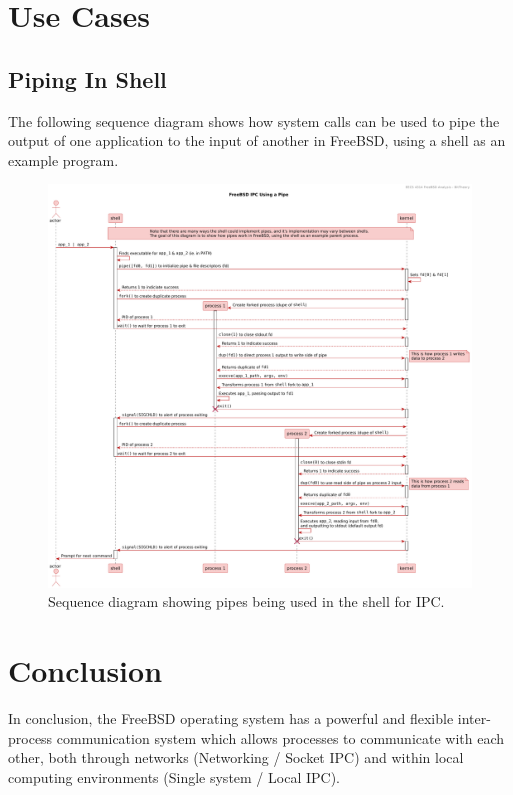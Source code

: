 \documentclass[12pt, dvipsnames, a4paper]{article}
\begin{document}
\clearpage
\section{Use Cases}
\subsection{Piping In Shell}
The following sequence diagram shows how system calls can be used to pipe the
output of one application to the input of another in FreeBSD, using a shell
as an example program.
\begin{figure}[!htb]
	\advance\leftskip-0.5cm
	\includegraphics[width = 570pt]{assets/use_case_diagrams/pipe.pdf}
	\caption{Sequence diagram showing pipes being used in the shell for IPC. \cite{pipe}\cite{fork}\cite{wait}\cite{close}\cite{dup}\cite{execve}\cite{signal}\cite{pipe-explained}}
\end{figure}

\clearpage
\section{Conclusion}
In conclusion, the FreeBSD operating system has a powerful and flexible inter-process communication system which allows processes to communicate with each other, both through networks (Networking / Socket IPC) and within local computing environments (Single system / Local IPC).
\end{document}
